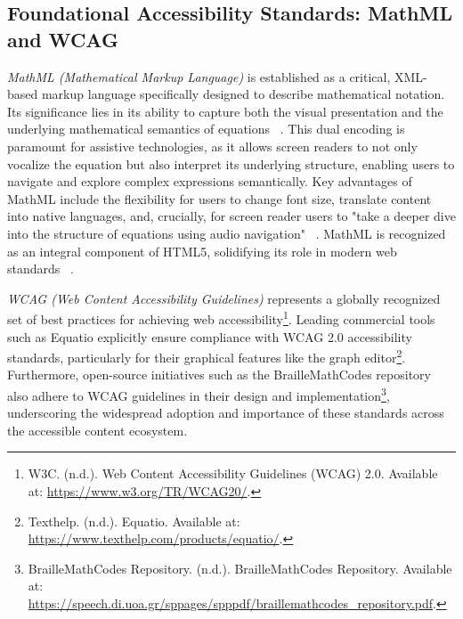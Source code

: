 \subsection{Foundational Accessibility Standards: MathML and WCAG}\label{subsec:mathml-wcag}

\emph{MathML (Mathematical Markup Language)} is established as a critical, XML-based markup language specifically designed to describe mathematical notation. Its significance lies in its ability to capture both the visual presentation and the underlying mathematical semantics of equations~ \cite{W3CMathML} \cite{W3CMathML3} \cite{W3CMathML4} \cite{W3CMathMLWeb}. This dual encoding is paramount for assistive technologies, as it allows screen readers to not only vocalize the equation but also interpret its underlying structure, enabling users to navigate and explore complex expressions semantically. Key advantages of MathML include the flexibility for users to change font size, translate content into native languages, and, crucially, for screen reader users to "take a deeper dive into the structure of equations using audio navigation"~ \cite{W3CMathML} \cite{W3CMathML3}. MathML is recognized as an integral component of HTML5, solidifying its role in modern web standards~ \cite{W3CMathMLWeb}.

\emph{WCAG (Web Content Accessibility Guidelines)} represents a globally recognized set of best practices for achieving web accessibility\footnote{W3C. (n.d.). Web Content Accessibility Guidelines (WCAG) 2.0. Available at: \url{https://www.w3.org/TR/WCAG20/}.}. Leading commercial tools such as Equatio explicitly ensure compliance with WCAG 2.0 accessibility standards, particularly for their graphical features like the graph editor\footnote{Texthelp. (n.d.). Equatio. Available at: \url{https://www.texthelp.com/products/equatio/}.}. Furthermore, open-source initiatives such as the BrailleMathCodes repository also adhere to WCAG guidelines in their design and implementation\footnote{BrailleMathCodes Repository. (n.d.). BrailleMathCodes Repository. Available at: \url{https://speech.di.uoa.gr/sppages/spppdf/braillemathcodes_repository.pdf}.}, underscoring the widespread adoption and importance of these standards across the accessible content ecosystem.

